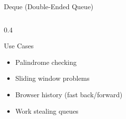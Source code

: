 \documentclass[aspectratio=169,xcolor=dvipsnames]{beamer}
\begin{document}
\begin{frame}[fragile]{Deque (Double-Ended Queue)}
\begin{columns}
\begin{column}{0.4\textwidth}

      \vspace{0.3cm}

      \begin{block}{Use Cases}
        \begin{itemize}
          \item Palindrome checking
          \item Sliding window problems
          \item Browser history (fast back/forward)
          \item Work stealing queues
        \end{itemize}
      \end{block}
    \end{column}
  \end{columns}
\end{frame}
\end{document}
